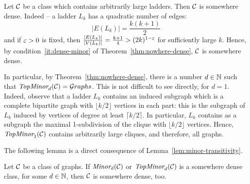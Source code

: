 \begin{example}\label{ex:ladders-dense}
  Let ${\cal C}$ be a class which contains arbitrarily large ladders.
  Then ${\cal C}$ is somewhere dense. Indeed -- a ladder $L_k$ has a quadratic number of edges:
  $${|E(L_k)|}=\frac{k(k+1)}{2}$$
  and if $\varepsilon>0$ is fixed, then $\frac{|E(L_k)|}{|V(L_k)|}=\frac{k+1}4>(2k)^{1-\varepsilon}$ for sufficiently large $k$.
Hence, by condition~\ref{it:dense-minor} of Theorem~\ref{thm:nowhere-dense}, ${\cal C}$ is somewhere dense.

In particular, by Theorem~\ref{thm:nowhere-dense},
 there is a number $d\in\mathbb{N}$ such that $\textit{TopMinor}_{d}({\cal C})={\mathcal G}\!\,raphs$. This is not difficult to see directly, 
 for $d=1$.
Indeed, observe that a ladder $L_k$ contains an induced subgraph which is a complete bipartite graph with $\lfloor k/2\rfloor$  vertices in each part: this is the subgraph of $L_k$ induced by vertices of degree at least $\lceil k/2\rceil$. In particular, $L_k$ contains as a subgraph the maximal 1-subdivision of the clique with $\lfloor k/2\rfloor$ vertices. Hence, $\textit{TopMinor}_{1}({\cal C})$ contains arbitrarily large cliques, and therefore, all graphs.
\end{example}

The following lemma is a direct consequence of Lemma~\ref{lem:minor-transitivity}.
\begin{lemma}\label{lem:nd-transitivity}
	Let ${\cal C}$ be a class of graphs.
	If 	$\textit{Minor}_{d}({\cal C})$ or $\textit{TopMinor}_{d}({\cal C})$ is a somewhere dense class,
	for some $d\in\mathbb{N}$, then ${\cal C}$ is somewhere dense, too.	
\end{lemma}

